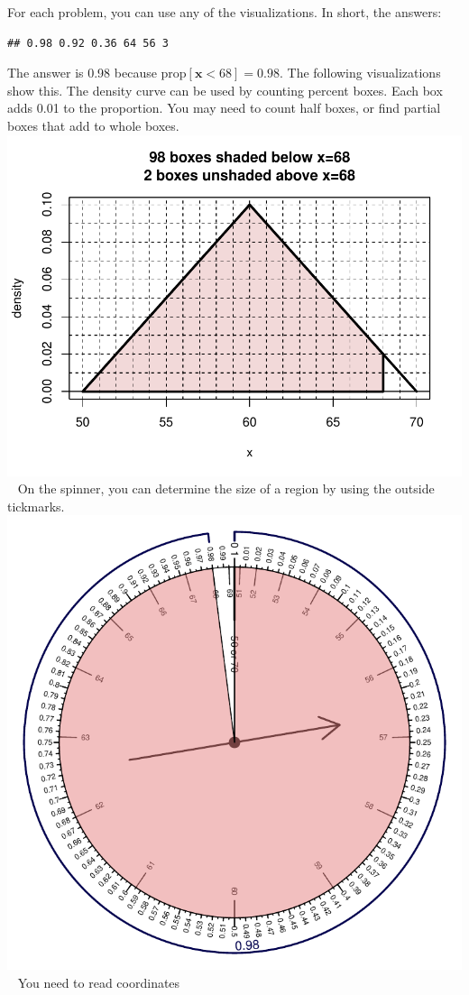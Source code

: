 \begin{solution}
For each problem, you can use any of the visualizations. In short, the
answers:

\begin{verbatim}
## 0.98 0.92 0.36 64 56 3
\end{verbatim}
\begin{answerlist}
  \item The answer is 0.98 because \(\text{prop}[\mathbf{x}<68]=0.98\). The
following visualizations show this. The density curve can be used by
counting percent boxes. Each box adds 0.01 to the proportion. You may
need to count half boxes, or find partial boxes that add to whole boxes.
\includegraphics{unnamed-chunk-5-1.pdf} ~ On the spinner, you can
determine the size of a region by using the outside tickmarks.
\includegraphics{unnamed-chunk-6-1.pdf} ~ You need to read coordinates

\end{answerlist}
\end{solution}
